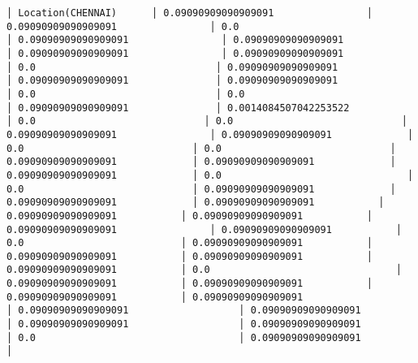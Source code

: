 \documentclass[11pt]{article}
\begin{document}
\begin{Verbatim}[commandchars=\\\{\}]
│ Location(CHENNAI)      │ 0.09090909090909091                │ 0.09090909090909091                │ 0.0                                │ 0.09090909090909091                │ 0.09090909090909091                │ 0.09090909090909091                │ 0.09090909090909091                │ 0.0                               │ 0.09090909090909091               │ 0.09090909090909091               │ 0.09090909090909091                │ 0.0                               │ 0.0                               │ 0.09090909090909091               │ 0.0014084507042253522           │ 0.0                             │ 0.0                             │ 0.09090909090909091                │ 0.09090909090909091             │ 0.0                             │ 0.0                             │ 0.09090909090909091             │ 0.09090909090909091             │ 0.09090909090909091             │ 0.0                                │ 0.0                             │ 0.09090909090909091             │ 0.09090909090909091             │ 0.09090909090909091           │ 0.09090909090909091           │ 0.09090909090909091           │ 0.09090909090909091                │ 0.09090909090909091           │ 0.0                           │ 0.09090909090909091           │ 0.09090909090909091           │ 0.09090909090909091           │ 0.09090909090909091           │ 0.0                                │ 0.09090909090909091           │ 0.09090909090909091           │ 0.09090909090909091           │ 0.09090909090909091                   │ 0.09090909090909091                   │ 0.09090909090909091                   │ 0.09090909090909091                   │ 0.09090909090909091                   │ 0.0                                   │ 0.09090909090909091                   │

\end{Verbatim}
\end{document}
